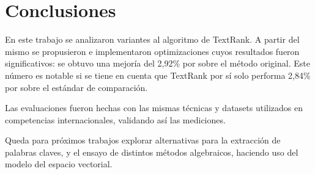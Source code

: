 \documentclass{llncs}
\begin{document}
\section{Conclusiones}
En este trabajo se analizaron variantes al algoritmo de TextRank. A partir del mismo se propusieron e implementaron optimizaciones cuyos resultados fueron significativos: se obtuvo una mejoría del 2,92\% por sobre el método original. Este número es notable si se tiene en cuenta que TextRank por sí solo performa 2,84\% por sobre el estándar de comparación.

Las evaluaciones fueron hechas con las mismas técnicas y datasets utilizados en competencias internacionales, validando así las mediciones.

Queda para próximos trabajos explorar alternativas para la extracción de palabras claves, y el ensayo de distintos métodos algebraicos, haciendo uso del modelo del espacio vectorial.


{}

\end{document}
